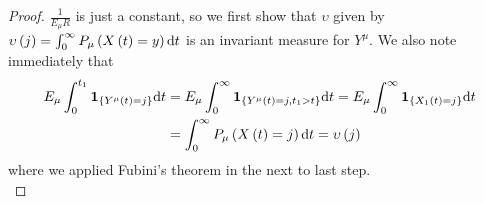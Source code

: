 \documentclass[12pt,a4paper]{scrartcl}
\numberwithin{equation}{section}
\begin{document}
\begin{proof}
$ \frac{1}{E_{\mu}R} $ is just a constant, so we first show that $ \upsilon $ given by $ \upsilon\left(j\right) =  \int_{0}^{\infty} P_{\mu}\left(X\left(t\right) = y\right) \textnormal{d} t $ is an invariant measure for $ Y^{\mu} $. We also note immediately that 
\begin{align*}
E_{\mu} \int_{0}^{t_1} \textbf{1}_{\lbrace Y^{\mu}\left(t\right) = j\rbrace } \textnormal{d}t &= E_{\mu} \int_{0}^{\infty} \textbf{1}_{\lbrace Y^{\mu}\left(t\right) = j, t_1 > t\rbrace } \textnormal{d}t = E_{\mu} \int_{0}^{\infty} \textbf{1}_{\lbrace X_1\left(t\right) = j\rbrace } \textnormal{d}t \\
&= \int_{0}^{\infty} P_{\mu} \left(X\left(t\right) = j\right) \textnormal{d}t = \upsilon\left(j\right)
\end{align*}
where we applied Fubini's theorem in the next to last step.\\[2ex]


\end{proof}
\end{document}
